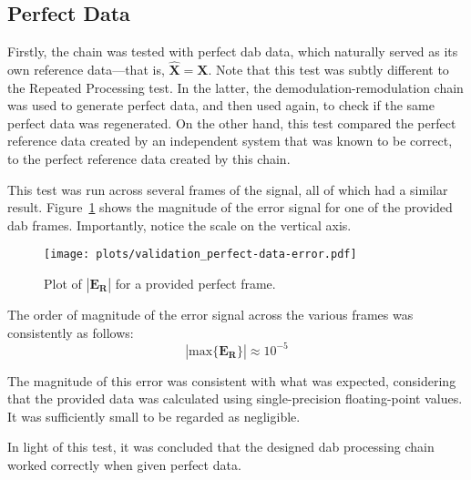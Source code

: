 \documentclass[class=report,11pt,crop=false]{standalone}
\begin{document}
\subsection{Perfect Data}
Firstly, the chain was tested with perfect \gls{dab} data, which naturally served as its own reference data---that is, \(\mathbf{\hat{X}} = \mathbf{X}\). Note that this test was subtly different to the Repeated Processing test. In the latter, the demodulation-remodulation chain was used to generate perfect data, and then used again, to check if the same perfect data was regenerated. On the other hand, this test compared the perfect reference data created by an independent system that was known to be correct, to the perfect reference data created by this chain.

This test was run across several frames of the signal, all of which had a similar result. Figure~\ref{fig:validation_perfect-data-error} shows the magnitude of the error signal for one of the provided \gls{dab} frames. Importantly, notice the scale on the vertical axis.

\begin{figure}
  \centering
  \captionsetup{type=figure}
  \texttt{[image: plots/validation\_perfect-data-error.pdf]}
  \caption{Plot of \(|\mathbf{E_R}|\) for a provided perfect  frame.}
  \label{fig:validation_perfect-data-error}
\end{figure}

The order of magnitude of the error signal across the various frames was consistently as follows:
\begin{equation}
  \left| \mathrm{max} \{ \mathbf{E_R} \} \right| \approx 10^{-5}
\end{equation}

The magnitude of this error was consistent with what was expected, considering that the provided data was calculated using single-precision floating-point values. It was sufficiently small to be regarded as negligible.

In light of this test, it was concluded that the designed \gls{dab} processing chain worked correctly when given perfect data.

\end{document}
